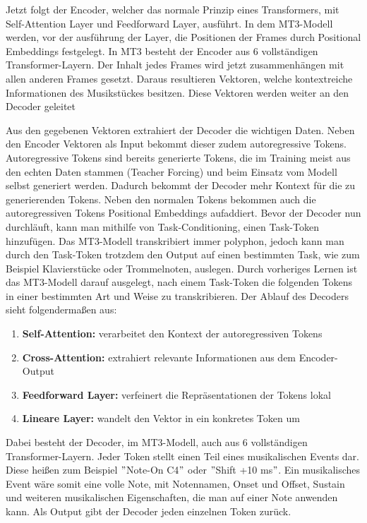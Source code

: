 Jetzt folgt der Encoder, welcher das normale Prinzip eines Transformers,
mit Self-Attention Layer und Feedforward Layer, ausführt.
In dem MT3-Modell werden, vor der ausführung der Layer,
die Positionen der Frames durch Positional Embeddings festgelegt.
In MT3 besteht der Encoder aus 6 vollständigen Transformer-Layern.
Der Inhalt jedes Frames wird jetzt zusammenhängen mit allen anderen Frames gesetzt.
Daraus resultieren Vektoren, welche kontextreiche Informationen des Musikstückes besitzen.
Diese Vektoren werden weiter an den Decoder geleitet

Aus den gegebenen Vektoren extrahiert der Decoder die wichtigen Daten.
Neben den Encoder Vektoren als Input bekommt dieser zudem autoregressive Tokens.
Autoregressive Tokens sind bereits generierte Tokens,
die im Training meist aus den echten Daten stammen (Teacher Forcing)
und beim Einsatz vom Modell selbst generiert werden.
Dadurch bekommt der Decoder mehr Kontext für die zu generierenden Tokens.
Neben den normalen Tokens bekommen auch die autoregressiven Tokens Positional Embeddings aufaddiert.
Bevor der Decoder nun durchläuft, kann man mithilfe von Task-Conditioning, einen Task-Token hinzufügen.
Das MT3-Modell transkribiert immer polyphon, jedoch kann man durch den Task-Token trotzdem den Output auf
einen bestimmten Task, wie zum Beispiel Klavierstücke oder Trommelnoten, auslegen.
Durch vorheriges Lernen ist das MT3-Modell darauf ausgelegt,
nach einem Task-Token die folgenden Tokens in einer bestimmten Art und Weise zu transkribieren.
Der Ablauf des Decoders sieht folgendermaßen aus:
\begin{enumerate}
  \item \textbf{Self-Attention:} verarbeitet den Kontext der autoregressiven Tokens
  \item \textbf{Cross-Attention:} extrahiert relevante Informationen aus dem Encoder-Output
  \item \textbf{Feedforward Layer:} verfeinert die Repräsentationen der Tokens lokal
  \item \textbf{Lineare Layer:} wandelt den Vektor in ein konkretes Token um
\end{enumerate}
Dabei besteht der Decoder, im MT3-Modell, auch aus 6 vollständigen Transformer-Layern.
Jeder Token stellt einen Teil eines musikalischen Events dar.
Diese heißen zum Beispiel \("\)Note-On C4\("\) oder \("\)Shift +10 ms\("\).
Ein musikalisches Event wäre somit eine volle Note, mit Notennamen, Onset und Offset,
Sustain und weiteren musikalischen Eigenschaften, die man auf einer Note anwenden kann.
Als Output gibt der Decoder jeden einzelnen Token zurück.

